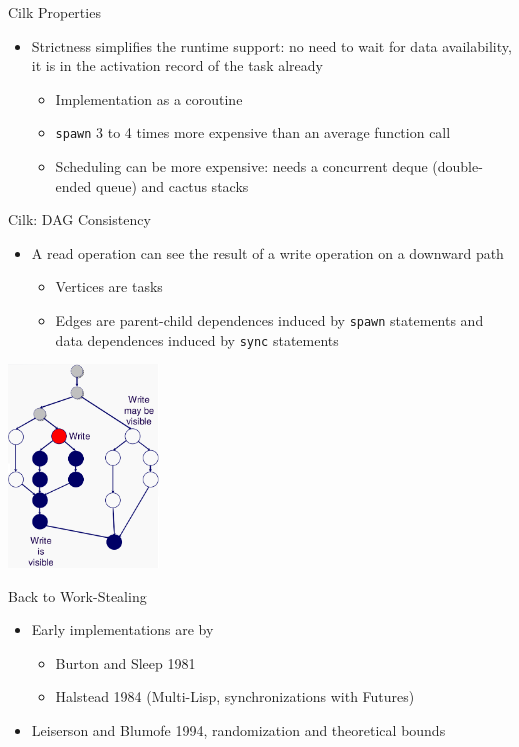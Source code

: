 \documentclass[xcolor=dvipsnames,9pt,mathserif]{beamer}
\begin{document}
\begin{frame}{Cilk Properties}
  \begin{itemize}
  \item Strictness simplifies the runtime support: no need to wait for
    data availability, it is in the activation record of the task already
    \begin{itemize}
    \item Implementation as a coroutine
    \item \texttt{spawn} 3 to 4 times more expensive
      than an average function call
    \item Scheduling can be more expensive: needs a concurrent deque
      (double-ended queue) and cactus stacks
    \end{itemize}
  \end{itemize}
\end{frame}

\begin{frame}{Cilk: DAG Consistency}
  \begin{minipage}{6cm}
    \begin{itemize}
    \item A read operation can see the result of a write operation on
      a downward path
      \begin{itemize}
      \item Vertices are tasks
      \item Edges are parent-child dependences induced by
        \texttt{spawn} statements and data dependences induced by
        \texttt{sync} statements
      \end{itemize}
    \end{itemize}
  \end{minipage}
  \hfill
  \begin{minipage}{4cm}
    \includegraphics[width=4cm]{dag_consistency}
  \end{minipage}
\end{frame}

\begin{frame}{Back to Work-Stealing}
  \begin{itemize}
  \item Early implementations are by
    \begin{itemize}
    \item Burton and Sleep 1981
    \item Halstead 1984 (Multi-Lisp, synchronizations with Futures)
    \end{itemize}
  \item Leiserson and Blumofe 1994, randomization and theoretical bounds
  \end{itemize}
\end{frame}  
\end{document}
